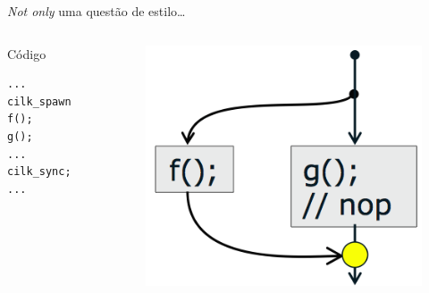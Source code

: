 \documentclass{beamer}
\begin{document}
\begin{frame}[fragile]{\emph{Not only} uma questão de estilo\ldots}
\begin{columns}[c]

\begin{column}{0.3\textwidth}
\begin{block}{Código}
\begin{lstlisting}
...
cilk_spawn f();
g();
...
cilk_sync;
...
\end{lstlisting}
\end{block}
\end{column}

\pause

\begin{column}{0.4\textwidth}
\begin{figure}
    \centering
    \includegraphics[width=\columnwidth]{./img/good-style.png}
\end{figure}
\end{column}
\end{columns}
\end{frame}
\end{document}
